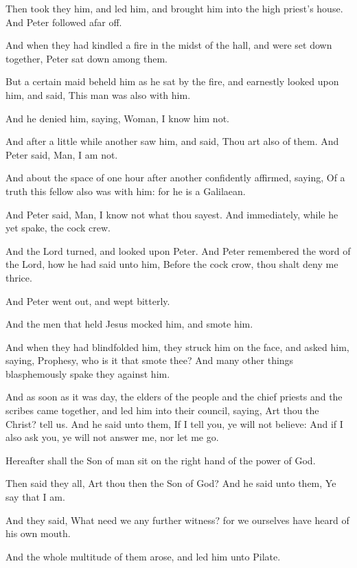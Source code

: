 \Verse Then took they him, and led him, and brought him into the high priest's house. And Peter followed afar off.

\Verse And when they had kindled a fire in the midst of the hall, and were set down together, Peter sat down among them.

\Verse But a certain maid beheld him as he sat by the fire, and earnestly looked upon him, and said, This man was also with him.

\Verse And he denied him, saying, Woman, I know him not.

\Verse And after a little while another saw him, and said, Thou art also of them. And Peter said, Man, I am not.

\Verse And about the space of one hour after another confidently affirmed, saying, Of a truth this fellow also was with him: for he is a Galilaean.

\Verse And Peter said, Man, I know not what thou sayest. And immediately, while he yet spake, the cock crew.

\Verse And the Lord turned, and looked upon Peter. And Peter remembered the word of the Lord, how he had said unto him, Before the cock crow, thou shalt deny me thrice.

\Verse And Peter went out, and wept bitterly.

\Verse And the men that held Jesus mocked him, and smote him.

\Verse And when they had blindfolded him, they struck him on the face, and asked him, saying, Prophesy, who is it that smote thee?  \Verse And many other things blasphemously spake they against him.

\Verse And as soon as it was day, the elders of the people and the chief priests and the scribes came together, and led him into their council, saying, \Verse Art thou the Christ? tell us. And he said unto them, If I tell you, ye will not believe: \Verse And if I also ask you, ye will not answer me, nor let me go.

\Verse Hereafter shall the Son of man sit on the right hand of the power of God.

\Verse Then said they all, Art thou then the Son of God? And he said unto them, Ye say that I am.

\Verse And they said, What need we any further witness? for we ourselves have heard of his own mouth.


\Chapter
\Verse And the whole multitude of them arose, and led him unto Pilate.

